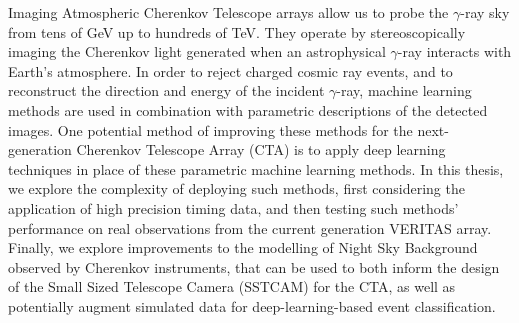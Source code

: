 Imaging Atmospheric Cherenkov Telescope arrays allow us to probe the $\gamma$-ray sky from tens of GeV up to hundreds of TeV. They operate by stereoscopically imaging the Cherenkov light generated when an astrophysical $\gamma$-ray interacts with Earth's atmosphere. In order to reject charged cosmic ray events, and to reconstruct the direction and energy of the incident $\gamma$-ray, machine learning methods are used in combination with parametric descriptions of the detected images. One potential method of improving these methods for the next-generation Cherenkov Telescope Array (CTA) is to apply deep learning techniques in place of these parametric machine learning methods. In this thesis, we explore the complexity of deploying such methods, first considering the application of high precision timing data, and then testing such methods' performance on real observations from the current generation VERITAS array. Finally, we explore improvements to the modelling of Night Sky Background observed by Cherenkov instruments, that can be used to both inform the design of the Small Sized Telescope Camera (SSTCAM) for the CTA, as well as potentially augment simulated data for deep-learning-based event classification.